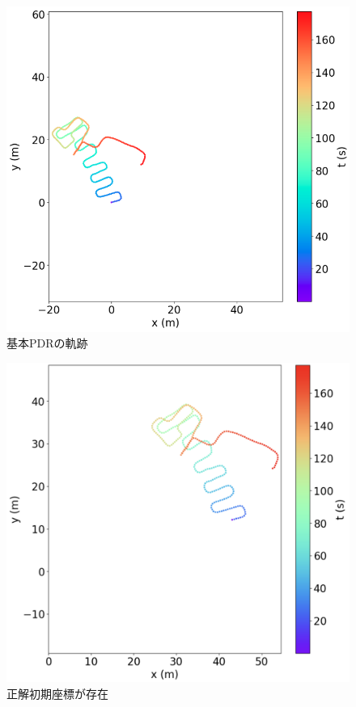 \begin{figure}[H]
    \centering
    \includegraphics[width=\linewidth]{image/pdr.jpg}
    \caption{基本PDRの軌跡}    \label{fig:pdr}
\end{figure}


\begin{figure}[H]
    \centering
    \includegraphics[width=\linewidth]{image/pdr-move.jpg}
    \caption{正解初期座標が存在}    \label{fig:pdr-move}
\end{figure}


